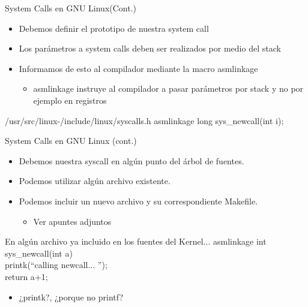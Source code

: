 \begin{frame}{System Calls en GNU Linux(Cont.)}
   \begin{itemize}  
   \item Debemos definir el prototipo de nuestra system call 
   \item Los parámetros a system calls deben ser realizados por medio del stack
   \item Informamos de esto al compilador mediante la macro asmlinkage
    \begin{itemize}
	 \item \alert{asmlinkage} instruye al compilador a pasar parámetros por stack y no 
          por ejemplo en registros 
    \end{itemize}   
 \end{itemize}

\begin{block}{/usr/src/linux-\KERNELBASEVERSION/include/linux/syscalls.h}
asmlinkage long sys\_newcall(int i);

\end{block}

\end{frame}

\begin{frame}{System Calls en GNU Linux (cont.)}
   \begin{itemize}  
   \item Debemos nuestra syscall en algún punto del árbol de fuentes. 
   \item Podemos utilizar algún archivo existente.
   \item Podemos incluir un nuevo archivo y su correspondiente Makefile. 
   \begin{itemize}
	 \item \alert{Ver apuntes adjuntos} 
    \end{itemize}   
 \end{itemize}

\begin{block}{En algún archivo ya incluido en los fuentes del Kernel...}
asmlinkage int sys\_newcall(int a) { \\
	printk(``calling newcall... '');   \\
  return a+1; \\
}
\end{block}
   \begin{itemize}
	 \item \alert{¿printk?}, ¿porque no printf? 
    \end{itemize}   

\end{frame}


